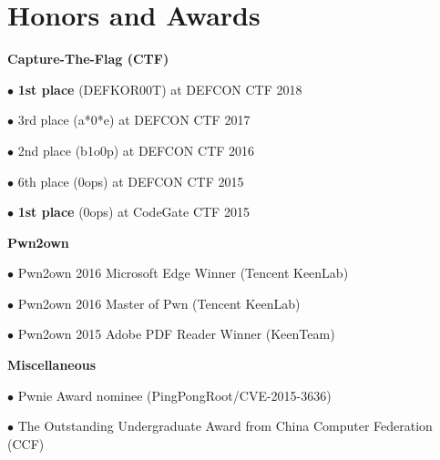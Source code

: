 \section*{Honors and Awards}
\begin{description}
\item{\bf {Capture-The-Flag (CTF)}}
	\item $\bullet$ \textbf{1st place} (DEFKOR00T) at DEFCON CTF 2018 
	\item $\bullet$ 3rd place (a*0*e) at DEFCON CTF 2017 
	\item $\bullet$ 2nd place (b1o0p) at DEFCON CTF 2016 
	\item $\bullet$ 6th place (0ops) at DEFCON CTF 2015 
	\item $\bullet$ \textbf{1st place} (0ops) at CodeGate CTF 2015 
\item{\bf {Pwn2own}}
	\item $\bullet$ Pwn2own 2016 Microsoft Edge Winner (Tencent KeenLab) 
	\item $\bullet$ Pwn2own 2016 Master of Pwn (Tencent KeenLab) 
	\item $\bullet$ Pwn2own 2015 Adobe PDF Reader Winner (KeenTeam) 
\item{\bf {Miscellaneous}}
	\item $\bullet$ Pwnie Award nominee (PingPongRoot/CVE-2015-3636) 
	\item $\bullet$ The Outstanding Undergraduate Award from China Computer Federation (CCF) 
\end{description}
